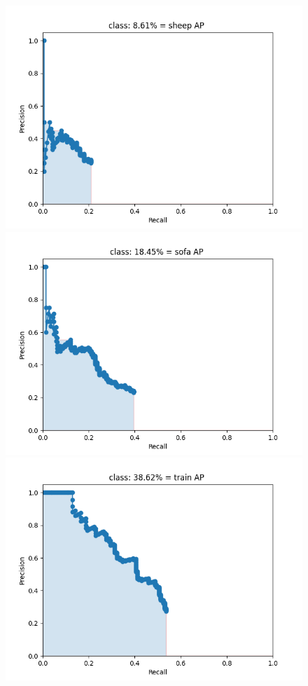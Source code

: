 \documentclass{article}%
\begin{document}
\begin{figure}[H]
    \centering
	\begin{minipage}{0.24\linewidth}
		\centering
		\includegraphics[width=0.9\linewidth]{fast_rcnn/mAP_output/classes/sheep.png}
	\end{minipage}
	\begin{minipage}{0.24\linewidth}
		\centering
		\includegraphics[width=0.9\linewidth]{fast_rcnn/mAP_output/classes/sofa.png}
	\end{minipage}
    \begin{minipage}{0.24\linewidth}
		\centering
		\includegraphics[width=0.9\linewidth]{fast_rcnn/mAP_output/classes/train.png}

\end{minipage}
\end{figure}
\end{document}
